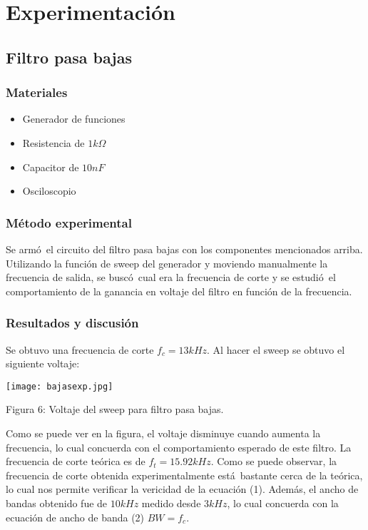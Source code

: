 \documentclass[11pt]{article}
\renewcommand{\=}[1]{\stackrel{#1}{=}} %
\theoremstyle{definition}
\theoremstyle{remark}
\begin{document}
\section{Experimentaci\'on}


\subsection{Filtro pasa bajas}
\subsubsection{Materiales}
\begin{itemize}
\item Generador de funciones
\item Resistencia de $1k\Omega$
\item Capacitor de $10nF$
\item Osciloscopio
\end{itemize}

\subsubsection{M\'etodo experimental}
Se arm\'o\ el circuito del filtro pasa bajas con los componentes mencionados arriba. Utilizando la funci\'on de sweep del generador y moviendo manualmente la frecuencia de salida, se busc\'o\ cual era la frecuencia de corte y se estudi\'o\ el comportamiento de la ganancia en voltaje del filtro en funci\'on de la frecuencia.

\subsubsection{Resultados y discusi\'on}
Se obtuvo una frecuencia de corte $f_c=13kHz$. Al hacer el sweep se obtuvo el siguiente voltaje:
\begin{center}
\texttt{[image: bajasexp.jpg]}
\end{center}
\begin{center}
Figura 6: Voltaje del sweep para filtro pasa bajas.
\end{center}
Como se puede ver en la figura, el voltaje disminuye cuando aumenta la frecuencia, lo cual concuerda con el comportamiento esperado de este filtro. La frecuencia de corte te\'orica es de $f_t=15.92kHz$. Como se puede observar, la frecuencia de corte obtenida experimentalmente est\'a\ bastante cerca de la te\'orica, lo cual nos permite verificar la vericidad de la ecuaci\'on (1). Adem\'as, el ancho de bandas obtenido fue de $10kHz$ medido desde $3kHz$, lo cual concuerda con la ecuaci\'on de ancho de banda (2) $BW=f_c$.
\end{document}
